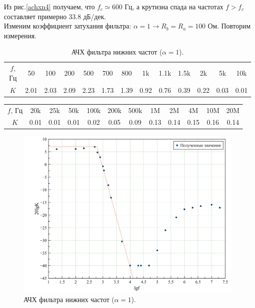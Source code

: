 \documentclass[a4paper, 12pt, twoside]{article}
\begin{document}
Из рис.\ref{achxn4} получаем, что $f_c \simeq 600$ Гц, а крутизна спада на частотах $f>f_c$ составляет примерно $33.8$ дБ/дек.
\\

Изменим коэффициент затухания фильтра: $\alpha = 1 \rightarrow R_b = R_a = 100$ Ом. Повторим измерения.
\begin{table}[H]
	\centering
	\caption{АЧХ фильтра нижних частот ($\alpha = 1$).}
	
	\begin{tabular}{c|cccccccccccc}\toprule
		$f$, Гц & 50   & 100  & 200  & 500  & 700  & 800  & 1k   & 1.1k & 1.5k & 2k   & 5k   & 10k  \\
		$K$     & 2.01 & 2.03 & 2.09 & 2.23 & 1.73 & 1.39 & 0.92 & 0.76 & 0.39 & 0.22 & 0.03 & 0.01 \\ \bottomrule
	\end{tabular}
\end{table}

\begin{table}[H]
	\centering
	
	\begin{tabular}{c|ccccccccccc}\toprule
		$f$, Гц & 20k & 25k & 50k  & 100k & 200k & 500k & 1M   & 2M   & 4M   & 10M  & 20M  \\
		$K$     & 0.01   & 0.01   & 0.01 & 0.02 & 0.05 & 0.09 & 0.13 & 0.14 & 0.15 & 0.16 & 0.14 \\ \bottomrule
	\end{tabular}
	
\end{table}
\begin{figure}[H]
	\centering
	\includegraphics[width = 0.7\linewidth]{1012}
	\caption{АЧХ фильтра нижних частот ($\alpha = 1$).}
	\label{achxn41}
	
\end{figure}
\end{document}
